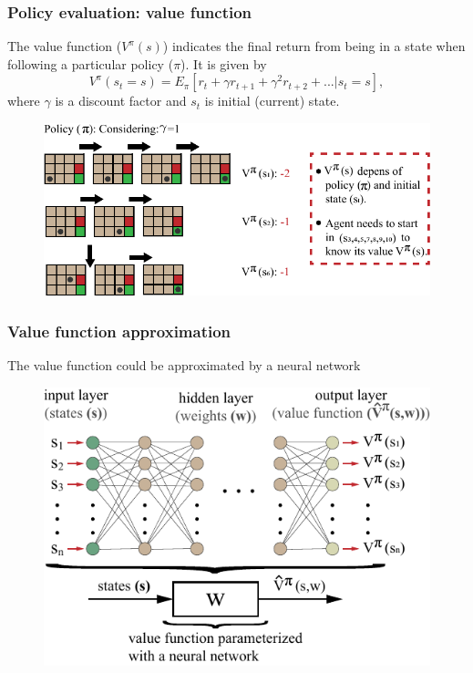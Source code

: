 \begin{frame}
	\frametitle{Policy evaluation: value function}
	The value function ($V^{\pi}(s)$) indicates the final return from being in a state when following a particular policy ($\pi$)\footnotemark[1]. It is given by
	\begin{equation*}
		V^{\pi}(s_t= s) = E_{\pi}  \left[r_t + \gamma r_{t+1} + \gamma^{2} r_{t+2}+ . . . | s_t = s \right],
	\end{equation*}
	\noindent where $\gamma$ is a discount factor and $s_t$ is initial {\color{gray} (current)} state.
	
	\begin{figure}
		\centering
		\includegraphics{policy_selection_v2.pdf}
	\end{figure}

\end{frame}

\begin{frame}
	\frametitle{Value function approximation}
	The value function could be approximated by a neural network

	\begin{figure}
		\includegraphics{value_function_cnn.pdf}
	\end{figure}
	
\end{frame}

